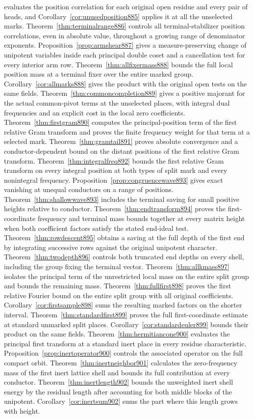 \documentclass[a4paper,11pt]{article}
\theoremstyle{definition}
\theoremstyle{remark}
\numberwithin{equation}{section}
\begin{document}
evaluates the position correlation for each original open residue and every pair of heads, and Corollary~\ref{cor:unusedposition885} applies it at all the unselected marks. Theorem~\ref{thm:terminalrange886} controls all terminal-stabilizer position correlations, even in absolute value, throughout a growing range of denominator exponents. Proposition~\ref{prop:armshear887} gives a measure-preserving change of unipotent variables inside each principal double coset and a cancellation test for every interior arm row. Theorem~\ref{thm:allfixermass888} bounds the full local position mass at a terminal fixer over the entire marked group. Corollary~\ref{cor:allmarks888} gives the product with the original open tests on the same fields. Theorem~\ref{thm:commoncompletion889} gives a positive majorant for the actual common-pivot terms at the unselected places, with integral dual frequencies and an explicit cost in the local zero coefficients. Theorem~\ref{thm:firstgram890} computes the principal-position term of the first relative Gram transform and proves the finite frequency weight for that term at a selected mark. Theorem~\ref{thm:gramtail891} proves absolute convergence and a conductor-dependent bound on the distant positions of the first relative Gram transform. Theorem~\ref{thm:integralfreq892} bounds the first relative Gram transform on every integral position at both types of split mark and every nonintegral frequency. Proposition~\ref{prop:congruencewave893} gives exact vanishing at unequal conductors on a range of positions. Theorem~\ref{thm:shallowwave893} includes the terminal saving for small positive heights relative to conductor. Theorem~\ref{thm:endtransform894} proves the first-coordinate frequency and terminal mass bounds together at every matrix height when both coefficient factors satisfy the stated end-ideal test. Theorem~\ref{thm:rowdescent895} obtains a saving at the full depth of the first end by integrating successive rows against the original unipotent character. Theorem~\ref{thm:twodepth896} controls both truncated end depths on every shell, including the group fixing the terminal vector. Theorem~\ref{thm:allkmass897} isolates the principal term of the unrestricted local mass on the entire split group and bounds the remaining mass. Theorem~\ref{thm:fullfirst898} proves the first relative Fourier bound on the entire split group with all original coefficients. Corollary~\ref{cor:firstsample898} sums the resulting marked factors on the shorter interval. Theorem~\ref{thm:standardfirst899} proves the full first-coordinate estimate at standard unmarked split places. Corollary~\ref{cor:standardeuler899} bounds their product on the same fields. Theorem~\ref{thm:hermitiancone900} evaluates the principal first transform at a standard inert place in every residue characteristic. Proposition~\ref{prop:inertoperator900} controls the associated operator on the full compact orbit. Theorem~\ref{thm:inertneighbor901} calculates the zero-frequency mass of the first inert lattice shell and bounds its full contribution at every conductor. Theorem~\ref{thm:inertlength902} bounds the unweighted inert shell energy by the residual length after accounting for both middle blocks of the unipotent. Corollary~\ref{cor:inertsum902} sums the part where this length grows with height. 
\end{document}

